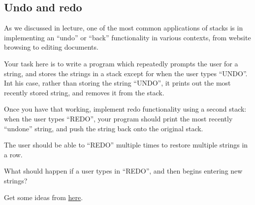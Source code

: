 \documentclass[12pt]{article}
\begin{document}
\subsection*{Undo and redo}
As we discussed in lecture, one of the most common applications of stacks is in
implementing an “undo” or “back” functionality in various contexts, from website
browsing to editing documents.

\bigskip

\noindent Your task here is to write a program which repeatedly prompts the user
for a string, and stores the strings in a stack except for when the user types
``UNDO''. Int his case, rather than storing the string ``UNDO'', it prints out
the most recently stored string, and removes it from the stack.

\bigskip

\noindent Once you have that working, implement redo functionality using a second stack:
when the user types “REDO”, your program should print the most recently ``undone''
string, and push the string back onto the original stack.

\bigskip

\noindent The user should be able to ``REDO'' multiple times to restore multiple strings in
a row.

\bigskip

\noindent What should happen if a user types in ``REDO'', and then begins entering new strings?

\bigskip

\noindent Get some ideas from \href{https://en.wikipedia.org/wiki/Undo#Redo_models}{here}.
\end{document}
